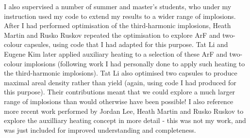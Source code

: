 I also supervised a number of summer and master's students, who under my instruction used my code to extend my results to a wider range of implosions. After I had performed optimisation of the third-harmonic implosions, Heath Martin and Rusko Ruskov repeated the optimisation to explore ArF and two-colour capsules, using code that I had adapted for this purpose. Tat Li and Eugene Kim later applied auxiliary heating to a selection of these ArF and two-colour implosions (following work I had personally done to apply such heating to the third-harmonic implosions). Tat Li also optimised two capsules to produce maximal areal density rather than yield (again, using code I had produced for this purpose). Their contributions meant that we could explore a much larger range of implosions than would otherwise have been possible! I also reference more recent work performed by Jordan Lee, Heath Martin and Rusko Ruskov to explore the auxilliary heating concept in more detail - this was not my work, and was just included for improved understanding and completeness.




